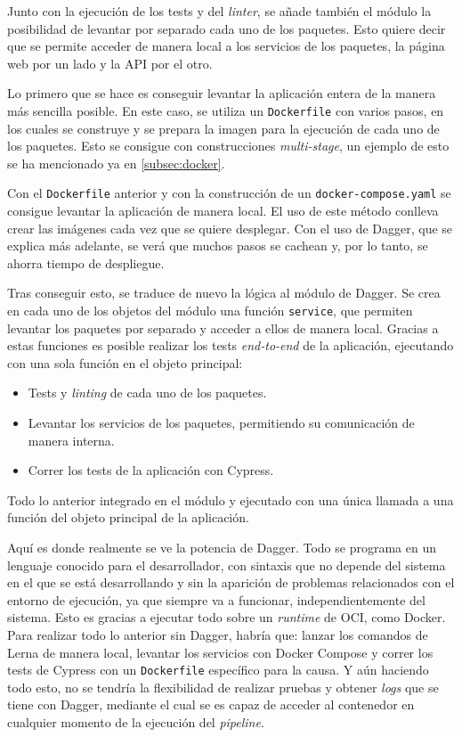 Junto con la ejecución de los tests y del \textit{linter}, se añade también el módulo la posibilidad de levantar por separado cada uno de los paquetes. Esto quiere decir que se permite acceder de manera local a los servicios de los paquetes, la página web por un lado y la API por el otro.

Lo primero que se hace es conseguir levantar la aplicación entera de la manera más sencilla posible. En este caso, se utiliza un \texttt{Dockerfile} con varios pasos, en los cuales se construye y se prepara la imagen para la ejecución de cada uno de los paquetes. Esto se consigue con construcciones \textit{multi-stage}, un ejemplo de esto se ha mencionado ya en \ref{subsec:docker}.

Con el \texttt{Dockerfile} anterior y con la construcción de un \texttt{docker-compose.yaml} se consigue levantar la aplicación de manera local. El uso de este método conlleva crear las imágenes cada vez que se quiere desplegar. Con el uso de Dagger, que se explica más adelante, se verá que muchos pasos se cachean y, por lo tanto, se ahorra tiempo de despliegue.

Tras conseguir esto, se traduce de nuevo la lógica al módulo de Dagger. Se crea en cada uno de los objetos del módulo una función \texttt{service}, que permiten levantar los paquetes por separado y acceder a ellos de manera local. Gracias a estas funciones es posible realizar los tests \textit{end-to-end} de la aplicación, ejecutando con una sola función en el objeto principal:

\begin{itemize}
  \item Tests y \textit{linting} de cada uno de los paquetes.
  \item Levantar los servicios de los paquetes, permitiendo su comunicación de manera interna.
  \item Correr los tests de la aplicación con Cypress.
\end{itemize}

Todo lo anterior integrado en el módulo y ejecutado con una única llamada a una función del objeto principal de la aplicación.

Aquí es donde realmente se ve la potencia de Dagger. Todo se programa en un lenguaje conocido para el desarrollador, con sintaxis que no depende del sistema en el que se está desarrollando y sin la aparición de problemas relacionados con el entorno de ejecución, ya que siempre va a funcionar, independientemente del sistema. Esto es gracias a ejecutar todo sobre un \textit{runtime} de OCI, como Docker. Para realizar todo lo anterior sin Dagger, habría que: lanzar los comandos de Lerna de manera local, levantar los servicios con Docker Compose y correr los tests de Cypress con un \texttt{Dockerfile} específico para la causa. Y aún haciendo todo esto, no se tendría la flexibilidad de realizar pruebas y obtener \textit{logs} que se tiene con Dagger, mediante el cual se es capaz de acceder al contenedor en cualquier momento de la ejecución del \textit{pipeline}.

